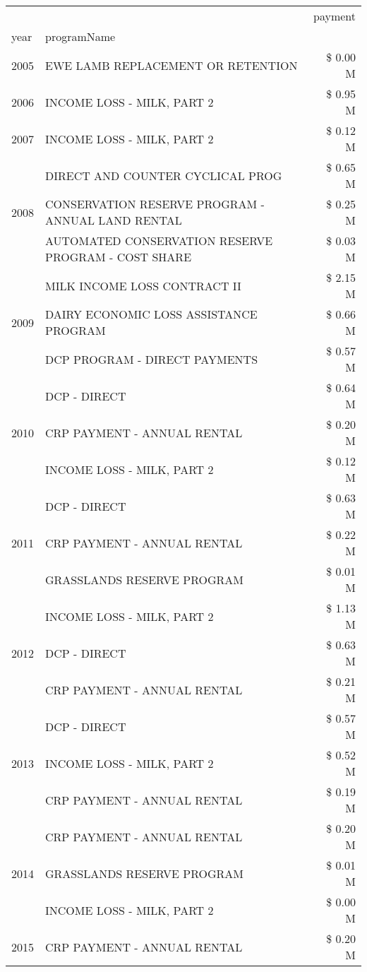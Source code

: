 \begin{tabular}{llr}
\toprule
 &  & payment \\
year & programName &  \\
\midrule
2005 & EWE LAMB REPLACEMENT OR RETENTION & \$ 0.00 M \\
\cline{1-3}
2006 & INCOME LOSS - MILK, PART 2 & \$ 0.95 M \\
\cline{1-3}
2007 & INCOME LOSS - MILK, PART 2 & \$ 0.12 M \\
\cline{1-3}
\multirow[t]{3}{*}{2008} & DIRECT AND COUNTER CYCLICAL PROG & \$ 0.65 M \\
 & CONSERVATION RESERVE PROGRAM - ANNUAL LAND RENTAL & \$ 0.25 M \\
 & AUTOMATED CONSERVATION RESERVE PROGRAM - COST SHARE & \$ 0.03 M \\
\cline{1-3}
\multirow[t]{3}{*}{2009} & MILK INCOME LOSS CONTRACT II & \$ 2.15 M \\
 & DAIRY ECONOMIC LOSS ASSISTANCE PROGRAM & \$ 0.66 M \\
 & DCP PROGRAM - DIRECT PAYMENTS & \$ 0.57 M \\
\cline{1-3}
\multirow[t]{3}{*}{2010} & DCP - DIRECT & \$ 0.64 M \\
 & CRP PAYMENT - ANNUAL RENTAL & \$ 0.20 M \\
 & INCOME LOSS - MILK, PART 2 & \$ 0.12 M \\
\cline{1-3}
\multirow[t]{3}{*}{2011} & DCP - DIRECT & \$ 0.63 M \\
 & CRP PAYMENT - ANNUAL RENTAL & \$ 0.22 M \\
 & GRASSLANDS RESERVE PROGRAM & \$ 0.01 M \\
\cline{1-3}
\multirow[t]{3}{*}{2012} & INCOME LOSS - MILK, PART 2 & \$ 1.13 M \\
 & DCP - DIRECT & \$ 0.63 M \\
 & CRP PAYMENT - ANNUAL RENTAL & \$ 0.21 M \\
\cline{1-3}
\multirow[t]{3}{*}{2013} & DCP - DIRECT & \$ 0.57 M \\
 & INCOME LOSS - MILK, PART 2 & \$ 0.52 M \\
 & CRP PAYMENT - ANNUAL RENTAL & \$ 0.19 M \\
\cline{1-3}
\multirow[t]{3}{*}{2014} & CRP PAYMENT - ANNUAL RENTAL & \$ 0.20 M \\
 & GRASSLANDS RESERVE PROGRAM & \$ 0.01 M \\
 & INCOME LOSS - MILK, PART 2 & \$ 0.00 M \\
\cline{1-3}
\multirow[t]{3}{*}{2015} & CRP PAYMENT - ANNUAL RENTAL & \$ 0.20 M \\

\end{tabular}

